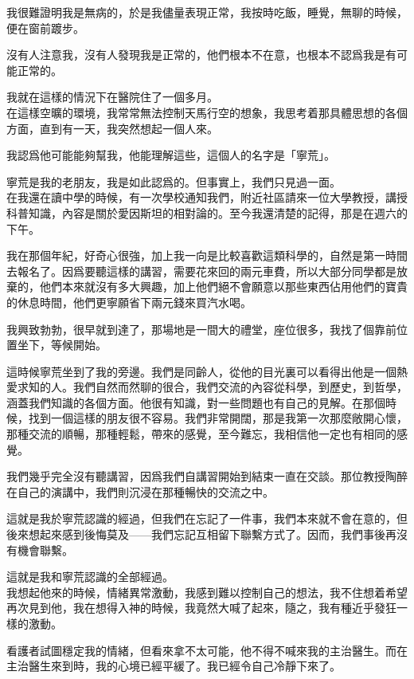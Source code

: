 我很難證明我是無病的，於是我儘量表現正常，我按時吃飯，睡覺，無聊的時候，便在窗前踱步。

沒有人注意我，沒有人發現我是正常的，他們根本不在意，也根本不認爲我是有可能正常的。

我就在這樣的情況下在醫院住了一個多月。
\\


在這樣空曠的環境，我常常無法控制天馬行空的想象，我思考着那具體思想的各個方面，直到有一天，我突然想起一個人來。

我認爲他可能能夠幫我，他能理解這些，這個人的名字是「寧荒」。

寧荒是我的老朋友，我是如此認爲的。但事實上，我們只見過一面。
\\

在我還在讀中學的時候，有一次學校通知我們，附近社區請來一位大學教授，講授科普知識，內容是關於愛因斯坦的相對論的。至今我還清楚的記得，那是在週六的下午。

我在那個年紀，好奇心很強，加上我一向是比較喜歡這類科學的，自然是第一時間去報名了。因爲要聽這樣的講習，需要花來回的兩元車費，所以大部分同學都是放棄的，他們本來就沒有多大興趣，加上他們絕不會願意以那些東西佔用他們的寶貴的休息時間，他們更寧願省下兩元錢來買汽水喝。

我興致勃勃，很早就到達了，那場地是一間大的禮堂，座位很多，我找了個靠前位置坐下，等候開始。

這時候寧荒坐到了我的旁邊。我們是同齡人，從他的目光裏可以看得出他是一個熱愛求知的人。我們自然而然聊的很合，我們交流的內容從科學，到歷史，到哲學，涵蓋我們知識的各個方面。他很有知識，對一些問題也有自己的見解。在那個時候，找到一個這樣的朋友很不容易。我們非常開闊，那是我第一次那麼敞開心懷，那種交流的順暢，那種輕鬆，帶來的感覺，至今難忘，我相信他一定也有相同的感覺。

我們幾乎完全沒有聽講習，因爲我們自講習開始到結束一直在交談。那位教授陶醉在自己的演講中，我們則沉浸在那種暢快的交流之中。

這就是我於寧荒認識的經過，但我們在忘記了一件事，我們本來就不會在意的，但後來想起來感到後悔莫及——我們忘記互相留下聯繫方式了。因而，我們事後再沒有機會聯繫。

這就是我和寧荒認識的全部經過。
\\


我想起他來的時候，情緒異常激動，我感到難以控制自己的想法，我不住想着希望再次見到他，我在想得入神的時候，我竟然大喊了起來，隨之，我有種近乎發狂一樣的激動。

看護者試圖穩定我的情緒，但看來拿不太可能，他不得不喊來我的主治醫生。而在主治醫生來到時，我的心境已經平緩了。我已經令自己冷靜下來了。

